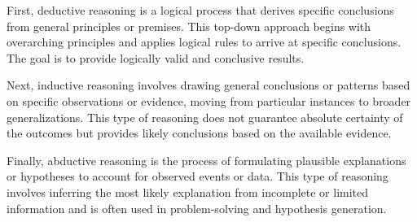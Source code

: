 First, deductive reasoning is a logical process that derives specific conclusions from general principles or premises. This top-down approach begins with overarching principles and applies logical rules to arrive at specific conclusions. The goal is to provide logically valid and conclusive results.

Next, inductive reasoning involves drawing general conclusions or patterns based on specific observations or evidence, moving from particular instances to broader generalizations. This type of reasoning does not guarantee absolute certainty of the outcomes but provides likely conclusions based on the available evidence.

Finally, abductive reasoning is the process of formulating plausible explanations or hypotheses to account for observed events or data. This type of reasoning involves inferring the most likely explanation from incomplete or limited information and is often used in problem-solving and hypothesis generation.

